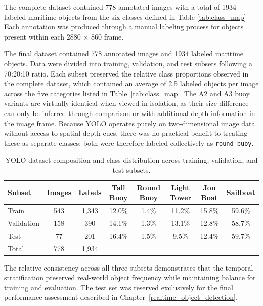 \documentclass{erauthesis}
\begin{document}
The complete dataset contained 778 annotated images with a total of 1934 labeled maritime objects from the six classes defined in Table \ref{tab:class_map} 
Each annotation was produced through a manual labeling process for objects present within each 2880 $\times$ 860 frame. 

The final dataset contained 778 annotated images and 1934 labeled maritime objects. 
Data were divided into training, validation, and test subsets following a 70:20:10 ratio.
Each subset preserved the relative class proportions observed in the complete dataset, which contained an average of 2.5 labeled objects per image across the five categories listed in Table~\ref{tab:class_map}.
The A2 and A3 buoy variants are virtually identical when viewed in isolation, as their size difference can only be inferred through comparison or with additional depth information in the image frame. 
Because YOLO operates purely on two-dimensional image data without access to spatial depth cues, there was no practical benefit to treating these as separate classes; both were therefore labeled collectively as \texttt{round\_buoy}.

\begin{table}[htbp]
\centering
\begin{tabular}{lccccccc}
\hline
Subset & Images & Labels & Tall Buoy & Round Buoy & Light Tower & Jon Boat & Sailboat \\
\hline
Train & 543 & 1,343 & 12.0\% & 1.4\% & 11.2\% & 15.8\% & 59.6\% \\
Validation & 158 & 390 & 14.1\% & 1.3\% & 13.1\% & 12.8\% & 58.7\% \\
Test & 77 & 201 & 16.4\% & 1.5\% & 9.5\% & 12.4\% & 59.7\% \\
\hline
Total & 778 & 1,934 &  &  &  &  &  \\
\hline
\end{tabular}
\caption{YOLO dataset composition and class distribution across training, validation, and test subsets.}
\label{table:yolo_data_split}
\end{table}

\noindent The relative consistency across all three subsets demonstrates that the temporal stratification preserved real-world object frequency while maintaining balance for training and evaluation. 
The test set was reserved exclusively for the final performance assessment described in Chapter~\ref{realtime_object_detection}.
\end{document}
